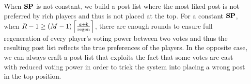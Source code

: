 \begin{proofsketch}
  When $\stpowvec$ is not constant, we build a post list where the most liked
  post is not preferred by rich players and thus is not placed at the top. For a
  constant $\stpowvec$, when $\rounds - 1 \geq \left(\postlen -
  1\right)\ceil*{\frac{a +b}{\regen}}$, there are enough rounds to ensure full
  regeneration of every player's voting power between two votes and thus the
  resulting post list reflects the true preferences of the players. In the
  opposite case, we can always craft a post list that exploits the fact that
  some votes are cast with reduced voting power in order to trick the system
  into placing a wrong post in the top position.
\end{proofsketch}
